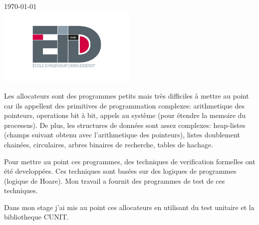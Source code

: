 \documentclass[11pt]{article}
\begin{document}
\begin{titlepage}
{\large \today}\\[0.1cm] %


\includegraphics[width=0.5\textwidth]{figures/eidd.jpeg}\\[0cm] %
 

\vfill %

\end{titlepage}

Les allocateurs sont des programmes petits mais très difficiles à mettre au point car ils appellent des primitives de programmation complexes: arithmetique des pointeurs, operations bit à bit, appels au système (pour étendre la memoire du processus). De plus, les structures de données sont assez complexes: heap-listes (champs suivant obtenu avec l'arithmetique des pointeurs), listes doublement chainées, circulaires, arbres binaires de recherche, tables de hachage. 

Pour mettre au point ces programmes, des techniques de verification formelles ont été developpées. Ces techniques sont basées sur des logiques de programmes (logique de Hoare). Mon travail a fournit des programmes de test de ces techniques.

Dans mon stage j'ai mis au point ces allocateurs en utilisant du test unitaire et la  bibliotheque CUNIT.
\clearpage

\tableofcontents







\end{document}
